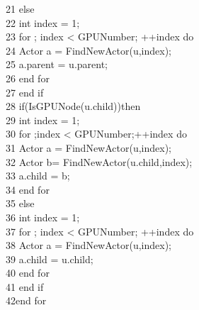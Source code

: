 \begin{breakablealgorithm}
  21  \hspace*{1 pc} else\\
  22  \hspace*{2 pc} int index = 1;\\
  23  \hspace*{2 pc} for ; index < GPUNumber; ++index do\\
  24  \hspace*{3 pc} Actor a = FindNewActor(u,index);\\
  25  \hspace*{3 pc} a.parent = u.parent;\\
  26  \hspace*{2 pc} end for\\
  27  \hspace*{1 pc} end if\\
  28  \hspace*{1 pc} if(IsGPUNode(u.child))then\\
  29  \hspace*{2 pc} int index = 1;\\
  30  \hspace*{2 pc} for ;index < GPUNumber;++index do\\
  31  \hspace*{3 pc} Actor a = FindNewActor(u,index);\\
  32  \hspace*{3 pc} Actor b= FindNewActor(u.child,index);\\
  33  \hspace*{3 pc} a.child = b;\\
  34  \hspace*{2 pc} end for\\
  35  \hspace*{1 pc} else\\
  36  \hspace*{2 pc} int index = 1;\\
  37  \hspace*{2 pc} for ; index < GPUNumber; ++index do\\
  38  \hspace*{3 pc} Actor a = FindNewActor(u,index);\\
  39  \hspace*{3 pc} a.child = u.child;\\
  40  \hspace*{2 pc} end for\\
  41  \hspace*{1 pc} end if\\
  42end for
\end{breakablealgorithm}


